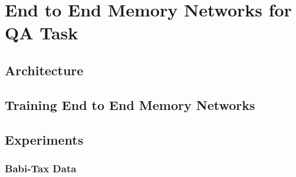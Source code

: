 \chapter{End to End Memory Networks for QA Task}
\section{Architecture}
\section{Training End to End Memory Networks}
\section{Experiments}
\subsection{Babi-Tax Data}
